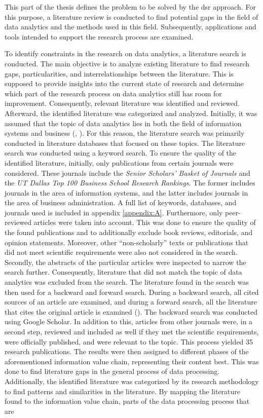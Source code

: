 This part of the thesis defines the problem to be solved by the \ac{dsr} approach. For this purpose, a literature review is conducted to find potential gaps in the field of data analytics and the methods used in this field. Subsequently, applications and tools intended to support the research process are examined.

To identify constraints in the research on data analytics, a literature search is conducted. The main objective is to analyze existing literature to find research gaps, particularities, and interrelationships between the literature. This is supposed to provide insights into the current state of research and determine which part of the research process on data analytics still has room for improvement. Consequently, relevant literature was identified and reviewed. Afterward, the identified literature was categorized and analyzed. Initially, it was assumed that the topic of data analytics lies in both the field of information systems and business (\cite{Abbasi.2016}, \cite{Levina.2005}). For this reason, the literature search was primarily conducted in literature databases that focused on these topics. The literature search was conducted using a keyword search. To ensure the quality of the identified literature, initially, only publications from certain journals were considered. These journals include the \textit{Senior Scholars' Basket of Journals} and the \textit{UT Dallas Top 100 Business School Research Rankings}. The former includes journals in the area of information systems, and the latter includes journals in the area of business administration. A full list of keywords, databases, and journals used is included in appendix \ref{appendix:A}. Furthermore, only peer-reviewed articles were taken into account. This was done to ensure the quality of the found publications and to additionally exclude book reviews, editorials, and opinion statements. Moreover, other \enquote{non-scholarly} texts or publications that did not meet scientific requirements were also not considered in the search. Secondly, the abstracts of the particular articles were inspected to narrow the search further. Consequently, literature that did not match the topic of data analytics was excluded from the search. The literature found in the search was then used for a backward and forward search. During a backward search, all cited sources of an article are examined, and during a forward search, all the literature that cites the original article is examined (\cite{Webster.2002}). The backward search was conducted using Google Scholar. In addition to this, articles from other journals were, in a second step, reviewed and included as well if they met the scientific requirements, were officially published, and were relevant to the topic. This process yielded 35 research publications. The results were then assigned to different phases of the aforementioned information value chain, representing their content best. This was done to find literature gaps in the general process of data processing. Additionally, the identified literature was categorized by its research methodology to find patterns and similarities in the literature. By mapping the literature found to the information value chain, parts of the data processing process that are 